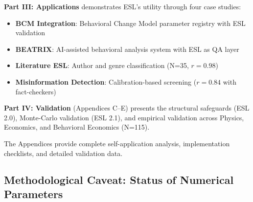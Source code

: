 \documentclass[11pt,a4paper]{article}
\begin{document}
\textbf{Part III: Applications} demonstrates ESL's utility through four case studies:
\begin{itemize}
    \item \textbf{BCM Integration}: Behavioral Change Model parameter registry with ESL validation
    \item \textbf{BEATRIX}: AI-assisted behavioral analysis system with ESL as QA layer
    \item \textbf{Literature ESL}: Author and genre classification (N=35, $r=0.98$)
    \item \textbf{Misinformation Detection}: Calibration-based screening ($r=0.84$ with fact-checkers)
\end{itemize}

\textbf{Part IV: Validation} (Appendices C--E) presents the structural safeguards (ESL 2.0), Monte-Carlo validation (ESL 2.1), and empirical validation across Physics, Economics, and Behavioral Economics (N=115).

The Appendices provide complete self-application analysis, implementation checklists, and detailed validation data.

\subsection{Methodological Caveat: Status of Numerical Parameters}
\label{sec:caveat}
\end{document}
